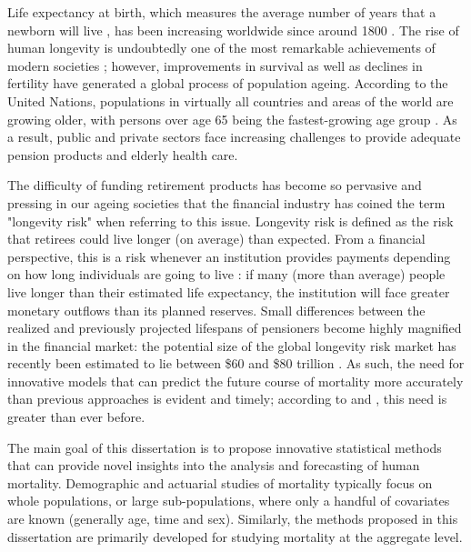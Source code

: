 \documentclass[Thesis]{subfiles}
\begin{document}
Life expectancy at birth, which measures the average number of years that a newborn will live \cite[if age-specific mortality rates remain constant over time,][]{preston2001demogr}, has been increasing worldwide since around 1800 \citep{riley2001rising}. The rise of human longevity is undoubtedly one of the most remarkable achievements of modern societies \citep{oeppen2002broken}; however, improvements in survival as well as declines in fertility have generated a global process of population ageing. According to the United Nations, populations in virtually all countries and areas of the world are growing older, with persons over age 65 being the fastest-growing age group \citep{United2019wpp}. As a result, public and private sectors face increasing challenges to provide adequate pension products and elderly health care.

The difficulty of funding retirement products has become so pervasive and pressing in our ageing societies that the financial industry has coined the term "longevity risk" when referring to this issue. Longevity risk is defined as the risk that retirees could live longer (on average) than expected. From a financial perspective, this is a risk whenever an institution provides payments depending on how long individuals are going to live \citep{blake2014sharing}: if many (more than average) people live longer than their estimated life expectancy, the institution will face greater monetary outflows than its planned reserves. Small differences between the realized and previously projected lifespans of pensioners become highly magnified in the financial market: the potential size of the global longevity risk market has recently been estimated to lie between \$60 and \$80 trillion \citep{michaelson2014strategy}. As such, the need for innovative models that can predict the future course of mortality more accurately than previous approaches is evident and timely; according to \cite{janssen2018advances} and \cite{bengtsson2019intro}, this need is greater than ever before.  

The main goal of this dissertation is to propose innovative statistical methods that can provide novel insights into the analysis and forecasting of human mortality. Demographic and actuarial studies of mortality typically focus on whole populations, or large sub-populations, where only a handful of covariates are known (generally age, time and sex). Similarly, the methods proposed in this dissertation are primarily developed for studying mortality at the aggregate level.
\end{document}
